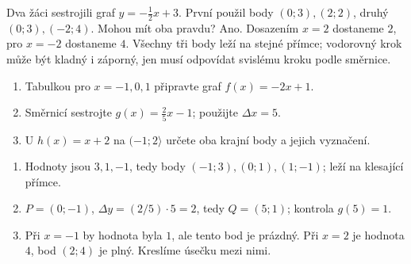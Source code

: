 \documentclass[11pt,a4paper]{article}
\begin{document}
\begin{zadaniReseniBox}
Dva žáci sestrojili graf $y=-\frac12x+3$. První použil body $(0;3),(2;2)$, druhý $(0;3),(-2;4)$. Mohou mít oba pravdu?
\tcblower
Ano. Dosazením $x=2$ dostaneme $2$, pro $x=-2$ dostaneme $4$. Všechny tři body leží na stejné přímce; vodorovný krok může být kladný i záporný, jen musí odpovídat svislému kroku podle směrnice.
\end{zadaniReseniBox}
\begin{zadaniReseniBox}
\begin{enumerate}[label=\alph*)]
\item Tabulkou pro $x=-1,0,1$ připravte graf $f(x)=-2x+1$.
\item Směrnicí sestrojte $g(x)=\frac25x-1$; použijte $\Delta x=5$.
\item U $h(x)=x+2$ na $(-1;2\rangle$ určete oba krajní body a jejich vyznačení.
\end{enumerate}
\tcblower
\begin{enumerate}[label=\alph*)]
\item Hodnoty jsou $3,1,-1$, tedy body $(-1;3),(0;1),(1;-1)$; leží na klesající přímce.
\item $P=(0;-1)$, $\Delta y=(2/5)\cdot5=2$, tedy $Q=(5;1)$; kontrola $g(5)=1$.
\item Při $x=-1$ by hodnota byla $1$, ale tento bod je prázdný. Při $x=2$ je hodnota $4$, bod $(2;4)$ je plný. Kreslíme úsečku mezi nimi.
\end{enumerate}
\end{zadaniReseniBox}
\end{document}
